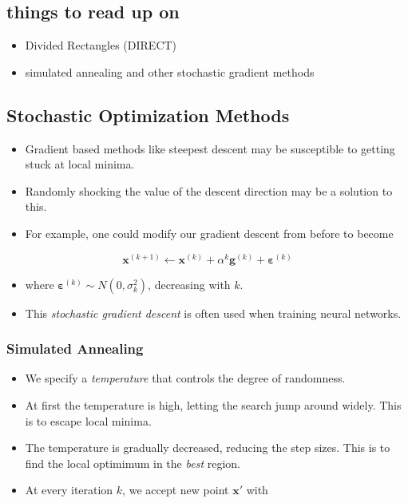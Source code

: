 \documentclass[11pt]{article}
\providecommand{\tightlist}{%
      \setlength{\itemsep}{0pt}\setlength{\parskip}{0pt}}
\begin{document}
    \subsection{things to read up on}\label{things-to-read-up-on}

\begin{itemize}
\tightlist
\item
  Divided Rectangles (DIRECT)
\item
  simulated annealing and other stochastic gradient methods
\end{itemize}

    \subsection{Stochastic Optimization
Methods}\label{stochastic-optimization-methods}

\begin{itemize}
\tightlist
\item
  Gradient based methods like steepest descent may be susceptible to
  getting stuck at local minima.
\item
  Randomly shocking the value of the descent direction may be a solution
  to this.
\item
  For example, one could modify our gradient descent from before to
  become
\end{itemize}

\[\mathbf{x}^{(k+1)} \longleftarrow \mathbf{x}^{(k)} +\alpha^k\mathbf{g}^{(k)} + \mathbf{\varepsilon}^{(k)}\]

\begin{itemize}
\tightlist
\item
  where \(\mathbf{\varepsilon}^{(k)} \sim N(0,\sigma_k^2)\), decreasing
  with \(k\).
\item
  This \emph{stochastic gradient descent} is often used when training
  neural networks.
\end{itemize}

    \subsubsection{Simulated Annealing}\label{simulated-annealing}

\begin{itemize}
\tightlist
\item
  We specify a \emph{temperature} that controls the degree of
  randomness.
\item
  At first the temperature is high, letting the search jump around
  widely. This is to escape local minima.
\item
  The temperature is gradually decreased, reducing the step sizes. This
  is to find the local optimimum in the \emph{best} region.
\item
  At every iteration \(k\), we accept new point \(\mathbf{x'}\) with
\end{itemize}
\end{document}
